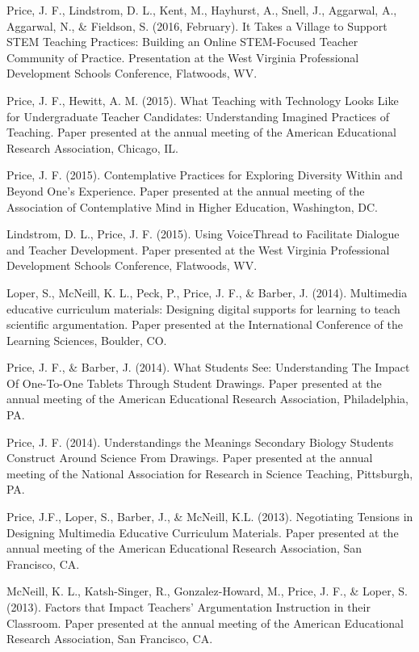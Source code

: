\documentclass[11pt,article,oneside]{memoir}
\begin{document}
\ind Price, J. F., Lindstrom, D. L., Kent, M., Hayhurst, A., Snell, J., Aggarwal, A., Aggarwal, N., \& Fieldson, S. (2016, February). It Takes a Village to Support STEM Teaching Practices: Building an Online STEM-Focused Teacher Community of Practice. Presentation at the West Virginia Professional Development Schools Conference, Flatwoods, WV.

\ind Price, J. F., Hewitt, A. M. (2015). What Teaching with Technology Looks Like for Undergraduate Teacher Candidates: Understanding Imagined Practices of Teaching. Paper presented at the annual meeting of the American Educational Research Association, Chicago, IL.

\ind Price, J. F. (2015). Contemplative Practices for Exploring Diversity Within and Beyond One’s Experience. Paper presented at the annual meeting of the Association of Contemplative Mind in Higher Education, Washington, DC.

\ind Lindstrom, D. L., Price, J. F. (2015). Using VoiceThread to Facilitate Dialogue and Teacher Development. Paper presented at the West Virginia Professional Development Schools Conference, Flatwoods, WV.

\ind Loper, S., McNeill, K. L., Peck, P., Price, J. F., \& Barber, J. (2014). Multimedia educative curriculum materials: Designing digital supports for learning to teach scientific argumentation. Paper presented at the International Conference of the Learning Sciences, Boulder, CO.

\ind Price, J. F., \& Barber, J. (2014). What Students See: Understanding The Impact Of One-To-One Tablets Through Student Drawings. Paper presented at the annual meeting of the American Educational Research Association, Philadelphia, PA.

\ind Price, J. F. (2014). Understandings the Meanings Secondary Biology Students Construct Around Science From Drawings. Paper presented at the annual meeting of the National Association for Research in Science Teaching, Pittsburgh, PA.

\ind Price, J.F., Loper, S., Barber, J., \& McNeill, K.L. (2013). Negotiating Tensions in Designing Multimedia Educative Curriculum Materials. Paper presented at the annual meeting of the American Educational Research Association, San Francisco, CA. 

\ind McNeill, K. L., Katsh-Singer, R., Gonzalez-Howard, M., Price, J. F., \& Loper, S. (2013). Factors that Impact Teachers’ Argumentation Instruction in their Classroom. Paper presented at the annual meeting of the American Educational Research Association, San Francisco, CA. 
\end{document}
